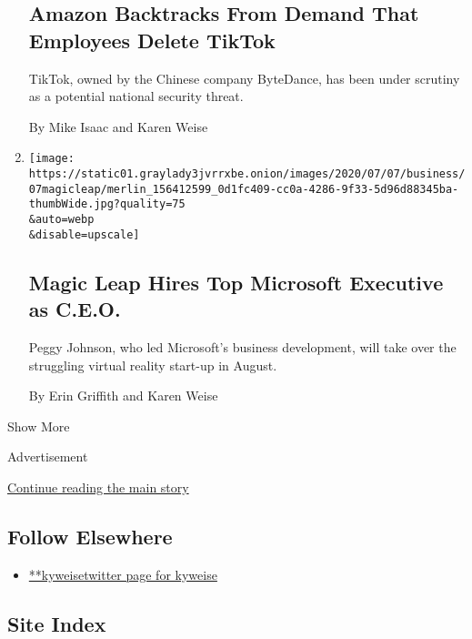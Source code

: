 \begin{enumerate}
{  \subsection{Amazon Backtracks From Demand That Employees Delete
  TikTok}\label{amazon-backtracks-from-demand-that-employees-delete-tiktok}}

  TikTok, owned by the Chinese company ByteDance, has been under
  scrutiny as a potential national security threat.

  By Mike Isaac and Karen Weise
\item
  \href{/2020/07/07/technology/peggy-johnson-magic-leap-ceo.html}{}

  \texttt{[image: https://static01.graylady3jvrrxbe.onion/images/2020/07/07/business/07magicleap/merlin\_156412599\_0d1fc409-cc0a-4286-9f33-5d96d88345ba-thumbWide.jpg?quality=75\\\&auto=webp\\\&disable=upscale]}

  \hypertarget{magic-leap-hires-top-microsoft-executive-as-ceo}{%
  \subsection{Magic Leap Hires Top Microsoft Executive as
  C.E.O.}\label{magic-leap-hires-top-microsoft-executive-as-ceo}}

  Peggy Johnson, who led Microsoft's business development, will take
  over the struggling virtual reality start-up in August.

  By Erin Griffith and Karen Weise
\end{enumerate}

Show More

Advertisement

\protect\hyperlink{after-mid2}{Continue reading the main story}

\hypertarget{follow-elsewhere}{%
\subsection{Follow Elsewhere}\label{follow-elsewhere}}

\begin{itemize}
\tightlist
\item
  \href{https://twitter.com/kyweise}{**kyweisetwitter page for kyweise}
\end{itemize}

\hypertarget{site-index}{%
\subsection{Site Index}\label{site-index}}

